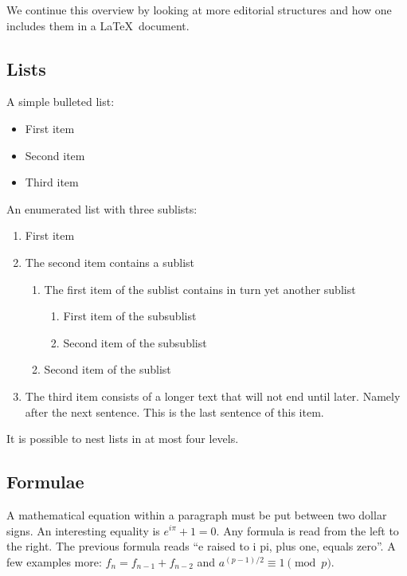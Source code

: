 \documentclass[11pt,a4paper]{article}
\begin{document}
  We continue this overview by looking at more editorial
  structures and how one includes them in a \LaTeX\ document.
	
	
  \subsection{Lists}

  A simple bulleted list:
  \begin{itemize}
  \item First item
  \item Second item
  \item Third item
  \end{itemize}
	
	An enumerated list with three sublists:
  \begin{enumerate}
  \item First item
  \item The second item contains a sublist
    \begin{enumerate}
    \item The first item of the sublist contains in turn yet
      another sublist
      \begin{enumerate}
      \item First item of the subsublist
      \item Second item of the subsublist
      \end{enumerate}
    \item Second item of the sublist
    \end{enumerate}
  \item The third item consists of a longer text that will not
    end until later. Namely after the next sentence. This is
    the last sentence of this item.
  \end{enumerate}
  It is possible to nest lists in at most four levels.
	
	\subsection{Formulae}

  A mathematical equation within a paragraph must be put
  between two dollar signs. An interesting equality is
  $e^{i\pi} + 1 = 0$. Any formula is read from the left to the
  right. The previous formula reads ``e raised to i pi, plus
  one, equals zero''.
	A few examples more: $f_n = f_{n - 1} + f_{n - 2}$ and
  $a^{(p - 1)/2} \equiv 1 \pmod{p}$.
\end{document}
